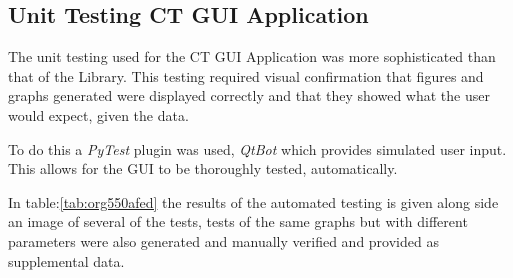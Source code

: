 \documentclass[11pt]{report}
\begin{document}
\clearpage

\subsection{Unit Testing CT GUI Application}
\label{sec:org31c2d80}

The unit testing used for the CT GUI Application was more sophisticated than that of the Library. This testing required visual confirmation that figures and graphs generated were displayed correctly and that they showed what the user would expect, given the data.

To do this a \emph{PyTest} plugin was used, \emph{QtBot} which provides simulated user input. This allows for the GUI to be thoroughly tested, automatically.

In table:\ref{tab:org550afed} the results of the automated testing is given along side an image of several of the tests, tests of the same graphs but with different parameters were also generated and manually verified and provided as supplemental data.
\end{document}

